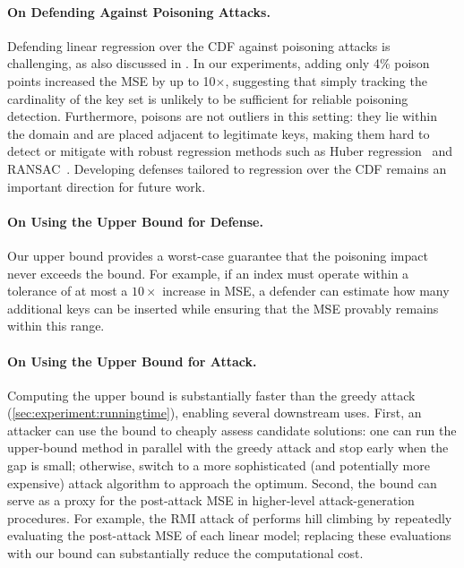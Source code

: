 \documentclass[acmsmall]{acmart}
\begin{document}
\paragraph{On Defending Against Poisoning Attacks.}
Defending linear regression over the CDF against poisoning attacks is challenging, as also discussed in \cite{kornaropoulos2022price}.
In our experiments, adding only 4\% poison points increased the MSE by up to 10$\times$, suggesting that simply tracking the cardinality of the key set is unlikely to be sufficient for reliable poisoning detection.
Furthermore, poisons are not outliers in this setting: they lie within the domain and are placed adjacent to legitimate keys, making them hard to detect or mitigate with robust regression methods such as Huber regression~\cite{huber1992robust} and RANSAC~\cite{fischler1981random}.
Developing defenses tailored to regression over the CDF remains an important direction for future work.

\paragraph{On Using the Upper Bound for Defense.}
Our upper bound provides a worst-case guarantee that the poisoning impact never exceeds the bound.
For example, if an index must operate within a tolerance of at most a $10\times$ increase in MSE, a defender can estimate how many additional keys can be inserted while ensuring that the MSE provably remains within this range.

\paragraph{On Using the Upper Bound for Attack.}
Computing the upper bound is substantially faster than the greedy attack (\cref{sec:experiment:runningtime}), enabling several downstream uses.
First, an attacker can use the bound to cheaply assess candidate solutions: one can run the upper-bound method in parallel with the greedy attack and stop early when the gap is small; otherwise, switch to a more sophisticated (and potentially more expensive) attack algorithm to approach the optimum.
Second, the bound can serve as a proxy for the post-attack MSE in higher-level attack-generation procedures.
For example, the RMI attack of \citet{kornaropoulos2022price} performs hill climbing by repeatedly evaluating the post-attack MSE of each linear model; replacing these evaluations with our bound can substantially reduce the computational cost.
\end{document}
